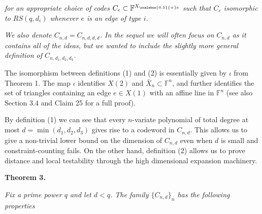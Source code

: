 \emph{for an appropriate choice of codes $C_{e}\subset\mathbb{F}^{{X}_{\scalebox{0.5}{+}e}}$ such that $C_{e}$ isomorphic to $RS(q,d_{i})$ whenever $e$ is an edge of type $i$.}\par




\emph{We also denote $C_{n,d}=C_{n,d,d,d}$. In the sequel we will often focus on $C_{n,d}$ as it contains all of the ideas, but we wanted to include the slightly more general definition of $C_{n,d_{1},d_{2},d_{3}}$.}\par






The isomorphism between definitions (1) and (2) is essentially given by $\iota$ from Theorem 1.
The map $\iota$ identifies $X(2)$ and $\bar{X}_{n}\subset\mathbb{F}^{n}$, and further identifies the set of triangles containing an edge $e\in X(1)$ with an affine line in $\mathbb{F}^{n}$ (see also Section 3.4
and Claim 25 for a full proof).\par




By definition (1) we can see that every $n$-variate polynomial of total degree at most $d=\min(d_{1},d_{2},d_{3})$ gives rise to a codeword in $C_{n,d}$. This allows us to give a non-trivial lower bound on the dimension of $C_{n,d}$ even when $d$ is small and constraint-counting fails. On the other hand, definition (2) allows us to prove distance and local testability through the high dimensional expansion machinery.\par





\par\medskip\noindent\textbf{
\textbf{Theorem 3}\textbf{.}
}\par



\emph{Fix a prime power $q$ and let $d<q$. The family $\{C_{n,d}\}_{n}$ has the following properties}\par


